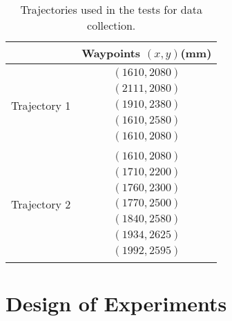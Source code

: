 \begin{table}[ht!]
    \centering
    \begin{tabular}{|c|c|}
        \hline
        & Waypoints $(x,y)$(mm)\\
        \hline
        Trajectory 1 & $\begin{array}{c}
                            (1610, 2080)\\
                            (2111, 2080)\\
                            (1910, 2380)\\
                            (1610, 2580)\\
                            (1610, 2080)
        \end{array}$\\
        \hline
        Trajectory 2 & $\begin{array}{c}
                            (1610, 2080)\\
                            (1710, 2200)\\
                            (1760, 2300)\\
                            (1770, 2500)\\
                            (1840, 2580)\\
                            (1934, 2625)\\
                            (1992, 2595)
        \end{array}$\\
        \hline
    \end{tabular}
    \caption{Trajectories used in the tests for data collection.}
    \label{tb:trajs}
\end{table}
\newpage
\section{Design of Experiments}
